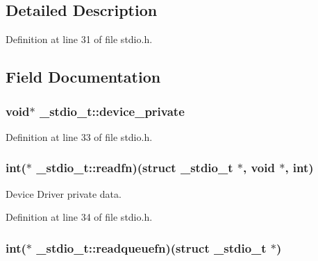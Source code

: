 \subsection{Detailed Description}


Definition at line 31 of file stdio.\-h.



\subsection{Field Documentation}
\hypertarget{struct__stdio__t_abe889179e50490e5eb8d2a3592166638}{
\subsubsection[{device\-\_\-private}]{\setlength{\rightskip}{0pt plus 5cm}void$\ast$ \-\_\-stdio\-\_\-t\-::device\-\_\-private}}\label{struct__stdio__t_abe889179e50490e5eb8d2a3592166638}


Definition at line 33 of file stdio.\-h.

\hypertarget{struct__stdio__t_a3698bb7d1020290bd662cf2e31c9d2c9}{
\subsubsection[{readfn}]{\setlength{\rightskip}{0pt plus 5cm}int($\ast$ \-\_\-stdio\-\_\-t\-::readfn)(struct {\bf \-\_\-stdio\-\_\-t} $\ast$, void $\ast$, int)}}\label{struct__stdio__t_a3698bb7d1020290bd662cf2e31c9d2c9}


Device Driver private data. 



Definition at line 34 of file stdio.\-h.

\hypertarget{struct__stdio__t_a302b5c7d886e2ad5831e7fb40129d10e}{
\subsubsection[{readqueuefn}]{\setlength{\rightskip}{0pt plus 5cm}int($\ast$ \-\_\-stdio\-\_\-t\-::readqueuefn)(struct {\bf \-\_\-stdio\-\_\-t} $\ast$)}}\label{struct__stdio__t_a302b5c7d886e2ad5831e7fb40129d10e}


